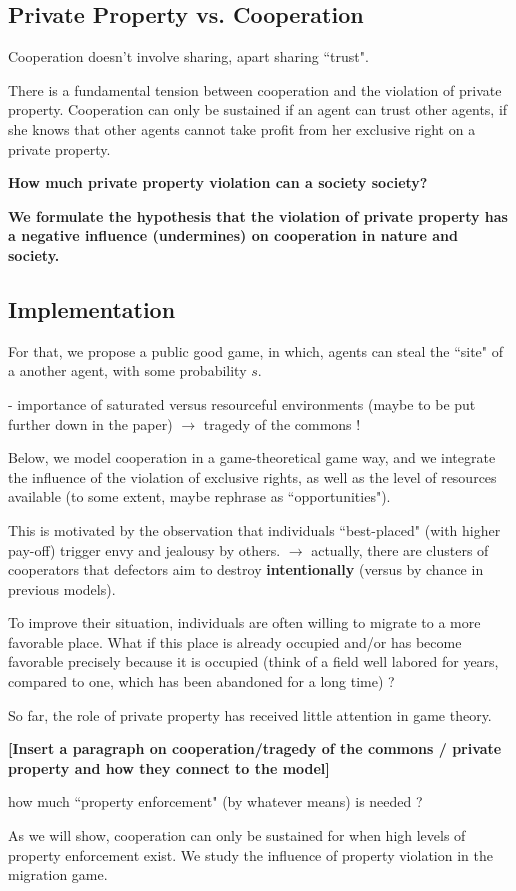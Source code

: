 \subsection*{Private Property vs. Cooperation}
Cooperation doesn't involve sharing, apart sharing ``trust".
 
There is a fundamental tension between cooperation and the violation of private property. Cooperation can only be sustained if an agent can trust other agents, if she knows that other agents cannot take profit from her exclusive right on a private property. 

{\bf How much private property violation can a society society?}

{\bf We formulate the hypothesis that the violation of private property has a negative influence (undermines) on cooperation in nature and society.}

\subsection*{Implementation}
For that, we propose a public good game, in which, agents can steal the ``site" of a another agent, with some probability $s$. 


- importance of saturated versus resourceful environments (maybe to be put further down in the paper) $\rightarrow$ tragedy of the commons !

Below, we model cooperation in a game-theoretical game  way,  and we integrate the influence of the violation of exclusive rights, as well as the level of resources available (to some extent, maybe rephrase as ``opportunities").

This is motivated by the observation that individuals ``best-placed" (with higher pay-off) trigger envy and jealousy by others. $\rightarrow$ actually, there are clusters of cooperators that defectors aim to destroy {\bf intentionally} (versus by chance in previous models).

To improve their situation, individuals are often willing to migrate to a more favorable place. What if this place is already occupied and/or has become favorable precisely because it is occupied (think of a field well labored for years, compared to one, which has been abandoned for a long time) ?

So far, the role of private property has received little attention in game theory.

{\bf [Insert a paragraph on cooperation/tragedy of the commons / private property and how they connect to the model]}

how much ``property enforcement" (by whatever means) is needed ? 

As we will show, cooperation can only be sustained for when high levels of property enforcement exist. We study the influence of property violation in the migration game.
